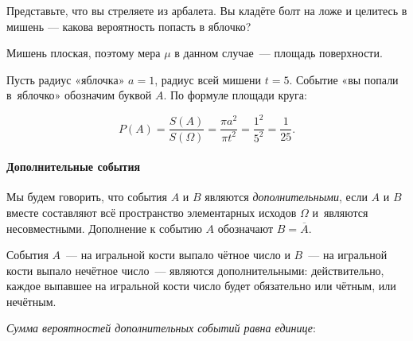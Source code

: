 \documentclass[11pt]{article}
\begin{document}
\begin{examples}
	Представьте, что вы стреляете из арбалета. Вы кладёте болт на ложе и целитесь в мишень — какова вероятность попасть в яблочко?
	
\begin{center}
\end{center}
	
	Мишень плоская, поэтому мера $\mu$ в данном случае~--- площадь поверхности.
	
	Пусть радиус «яблочка» $a=1$, радиус всей мишени $t=5$. Событие «вы попали в~яблочко» обозначим буквой $A$. По формуле площади круга:
	
	$$
	P(A)=\frac{S(A)}{S(\Omega)}=\frac{\pi{a}^2}{\pi{t}^2} =\frac{1^2}{5^2}=\frac{1}{25}.
	$$
\end{examples}

\paragraph{Дополнительные события} Мы будем говорить, что события $A$ и $B$ являются \emph{дополнительными}, если $A$ и $B$ вместе составляют всё пространство элементарных исходов $\Omega$ и~являются несовместными. Дополнение к событию $A$ обозначают $B=\overline{A}$.

\begin{examples}
	События $A$~--- на игральной кости выпало чётное число  и $B$~--- на игральной кости выпало нечётное число~--- являются дополнительными: действительно, каждое выпавшее на игральной кости число будет обязательно или чётным, или нечётным.
\end{examples}

\emph{Сумма вероятностей дополнительных событий равна единице}:
\end{document}
